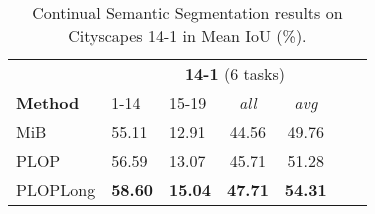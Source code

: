 \begin{table}[t]
    \centering
    \caption{Continual Semantic Segmentation results on Cityscapes 14-1 in Mean IoU (\%).}
    \vspace*{-0.3cm}
    \label{tab:cityscapes_class}
    \begin{tabular}{@{}l|p{1cm}p{1cm}|cccc@{}}
        \toprule
                                                     & \multicolumn{6}{c}{\textbf{14-1} (6 tasks)}                                                    \\
        \textbf{Method}                              & 1-14                                        & 15-19          & \textit{all}   & \textit{avg}   \\
        \midrule
        MiB \cite{cermelli2020modelingthebackground} & 55.11                                       & 12.91          & 44.56          & 49.76          \\
        PLOP                                         & 56.59                                       & 13.07          & 45.71          & 51.28          \\
        PLOPLong                                     & \textbf{58.60}                              & \textbf{15.04} & \textbf{47.71} & \textbf{54.31} \\
        \bottomrule
    \end{tabular}
\end{table}

